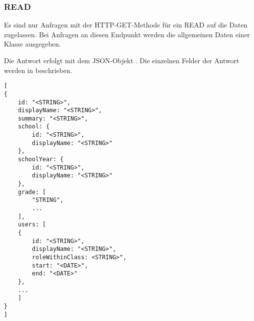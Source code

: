 \subsubsection{READ}
\label{sec:rest:api:classes:id:read}
Es sind nur Anfragen mit der HTTP-GET-Methode für ein READ auf die Daten zugelassen.
Bei Anfragen an diesen Endpunkt werden die allgemeinen Daten einer Klasse ausgegeben.

Die Antwort erfolgt mit dem JSON-Objekt . 
Die einzelnen Felder der Antwort werden in  beschrieben.

\begin{lstlisting}[caption={JSON-Antwort für einen GET-Aufruf des Pfads /api/classes/\$id},label={lst:code:rest:api:classes:id:read:ret},frame=tlrb]
[
{
    id: "<STRING>",
    displayName: "<STRING>",
    summary: "<STRING>",
    school: {
        id: "<STRING>",
        displayName: "<STRING>"
    },
    schoolYear: {
        id: "<STRING>",
        displayName: "<STRING>"
    },
    grade: [
        "STRING",
        ...
    ],
    users: [
    {
        id: "<STRING>",
        displayName: "<STRING>",
        roleWithinClass: <STRING>",
        start: "<DATE>",
        end: "<DATE>"    
    },
    ...
    ]
}
]
\end{lstlisting}

